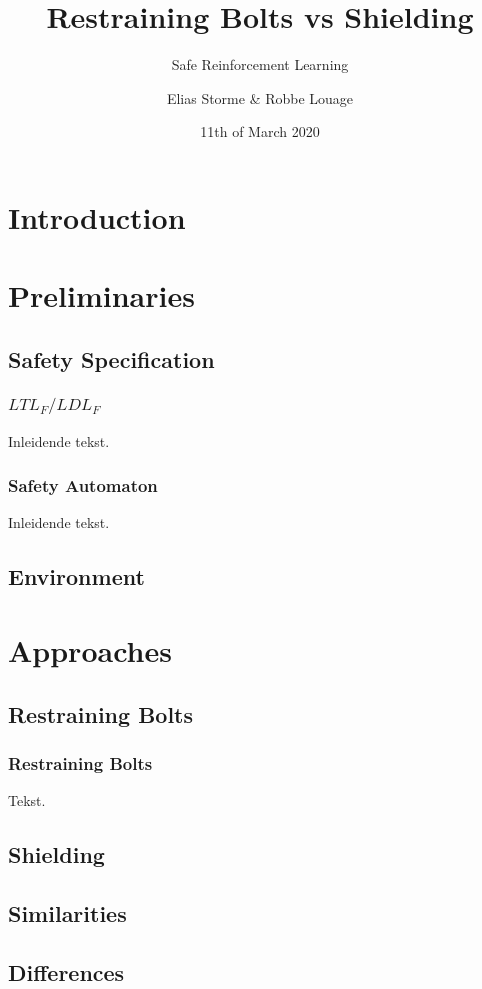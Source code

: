 \documentclass[kul]{kulakbeamer}
\title[Bolts vs. Shields]{Restraining Bolts vs Shielding}
\subtitle{Safe Reinforcement Learning}
\author[Robbe \& Elias]{Elias Storme \& Robbe Louage}
\date{11th of March 2020}
\institute[Dept. CW]{Dept. Computerwetenschappen}
\begin{document}
\begin{titleframe}
\titlepage
\end{titleframe}

\begin{outlineframe}[Outline]
	{
		\hypersetup{hidelinks} %
		\hfill	{\large\parbox{.95\textwidth}{\tableofcontents[hidesubsections]}}
	}
\end{outlineframe}

\section{Introduction}
\section{Preliminaries}
\subsection{Safety Specification}
\begin{frame}
\frametitle{$LTL_F/LDL_F$}
Inleidende tekst.
\end{frame}
\begin{frame}
\frametitle{Safety Automaton}
Inleidende tekst.
\end{frame}
\subsection{Environment}

\section{Approaches}
\subsection{Restraining Bolts}
\begin{frame}
\frametitle{Restraining Bolts}
Tekst.
\end{frame}
\subsection{Shielding}
\subsection{Similarities}
\subsection{Differences}
\end{document}
